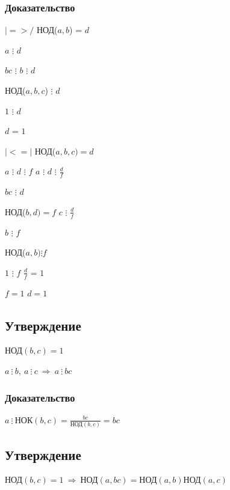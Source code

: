 \documentclass[12pt]{article}
\renewcommand{\gcd}{\text{НОД}}
\begin{document}
            \subsubsection{Доказательство}
        $|=>/$ НОД($a, b$) = $d$ \par
        $a$ $\vdots$ $d$ \par
        $bc$ $\vdots$ $b$ $\vdots$ $d$ \par
            НОД($a, b, c$) $\vdots$ $d$ \par
        $1$ $\vdots$ $d$ \par
        $d$ = $1$\par
        $|<=|$ НОД($a, b, c) = d$\par
        $a$ $\vdots$ $d$ $\vdots$ $f$ \qquad  $a$ $\vdots$ $d$ $\vdots$ $\frac{d}{f}$ \par
        $bc$ $\vdots$ $d$ \par
            НОД($b, d) = f$ \qquad  $c$ $\vdots$ $\frac{d}{f}$\par
        $b$ $\vdots$ $f$ \par
            НОД($a, b) \vdots f$ \par
        $1$ $\vdots$ $f$ \qquad $\frac{d}{f}$ = $1$\par
        $f = 1$ \qquad $d = 1$ \par
            \subsection{Утверждение}
        $\gcd(b, c) = 1$ \par
        $a\ \vdots\ b,\ a\ \vdots\ c\ \Rightarrow\ a\ \vdots\ bc$
            \subsubsection{Доказательство}
        $a\ \vdots\ \text{НОК}(b, c) = \frac{bc}{\gcd(b, c)} = bc$
            \subsection{Утверждение}
        $\gcd(b, c) = 1\ \Rightarrow\ \gcd(a, bc) = \gcd(a, b)\gcd(a, c)$
\end{document}
